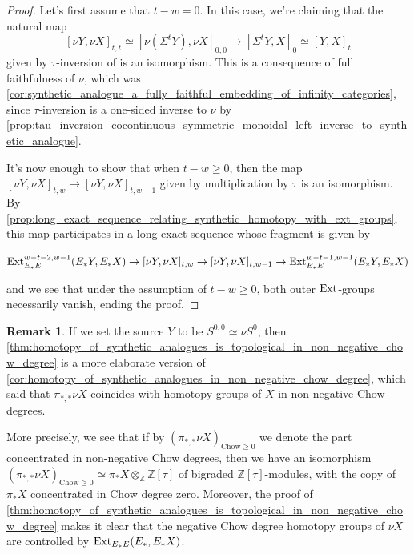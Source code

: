 \documentclass[oneside,a4paper]{amsart}
\newcommand{\Ext}{\textnormal{Ext}} %
\theoremstyle{plain}
\theoremstyle{definition}
\newtheorem{rem}[thm]{Remark}
\theoremstyle{remark}
\begin{document}
\begin{proof}
Let's first assume that $t - w = 0$. In this case, we're claiming that the natural map
\[
[\nu Y, \nu X]_{t, t} \simeq [\nu (\Sigma^{t}Y), \nu X]_{0, 0} \rightarrow [\Sigma^{t} Y, X]_{0} \simeq [Y, X]_{t}
\]
given by $\tau$-inversion of is an isomorphism. This is a consequence of full faithfulness of $\nu$, which was \cref{cor:synthetic_analogue_a_fully_faithful_embedding_of_infinity_categories}, since $\tau$-inversion is a one-sided inverse to $\nu$ by \cref{prop:tau_inversion_cocontinuous_symmetric_monoidal_left_inverse_to_synthetic_analogue}. 

It's now enough to show that when $t - w \geq 0$, then the map $[\nu Y, \nu X]_{t, w} \rightarrow [\nu Y, \nu X]_{t, w-1}$ given by multiplication by $\tau$ is an isomorphism. By \cref{prop:long_exact_sequence_relating_synthetic_homotopy_with_ext_groups}, this map participates in a long exact sequence whose fragment is given by 

\begin{center}
$\textnormal{Ext}^{w-t-2, w-1}_{E_{*}E}(E_{*}Y, E_{*}X) \rightarrow [\nu Y, \nu X]_{t, w} \rightarrow [\nu Y, \nu X]_{t, w-1} \rightarrow \textnormal{Ext}^{w-t-1, w-1}_{E_{*}E}(E_{*}Y, E_{*}X)$
\end{center}
and we see that under the assumption of $t - w \geq 0$, both outer $\textnormal{Ext}$-groups necessarily vanish, ending the proof. 
\end{proof}

\begin{rem}
\label{rem:non_negative_chow_degree_homotopy_of_synthetic_analogues_as_a_ctau_module}
If we set the source $Y$ to be $S^{0,0} \simeq \nu S^{0}$, then \cref{thm:homotopy_of_synthetic_analogues_is_topological_in_non_negative_chow_degree} is a more elaborate version of \cref{cor:homotopy_of_synthetic_analogues_in_non_negative_chow_degree}, which said that $\pi_{*, *} \nu X$ coincides with homotopy groups of $X$ in non-negative Chow degrees.

More precisely, we see that if by $(\pi_{*, *} \nu X)_{\mathrm{Chow} \geq 0}$ we denote the part concentrated in non-negative Chow degrees, then we have an isomorphism $(\pi_{*, *} \nu X)_{\mathrm{Chow} \geq 0} \simeq \pi_{*} X \otimes _{\mathbb{Z}} \mathbb{Z}[\tau]$ of bigraded $\mathbb{Z}[\tau]$-modules, with the copy of $\pi_{*}X$ concentrated in Chow degree zero. Moreover, the proof of \cref{thm:homotopy_of_synthetic_analogues_is_topological_in_non_negative_chow_degree} makes it clear that the negative Chow degree homotopy groups of $\nu X$ are controlled by $\Ext_{E_{*}E}(E_{*}, E_{*}X)$. 
\end{rem}
\end{document}
